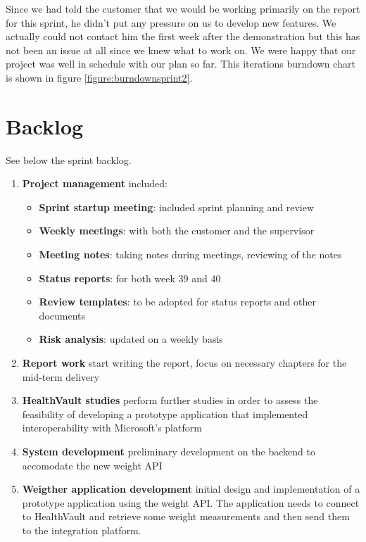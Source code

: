 Since we had told the customer that we would be working primarily on the report for this sprint, he didn't put any pressure on us to develop new features. 
We actually could not contact him the first week after the demonstration but this has not been an issue at all since we knew what to work on. 
We were happy that our project was well in schedule with our plan so far.
This iterations burndown chart is shown in figure \ref{figure:burndownsprint2}.

\clearpage
\section{Backlog}

See below the sprint backlog.
\begin{enumerate}[1.]
	\item \textbf{Project management} included:
	\begin{itemize}
		\item \textbf{Sprint startup meeting}:
			included sprint planning and review
		\item \textbf{Weekly meetings}:
			with both the customer and the supervisor
		\item \textbf{Meeting notes}:
			taking notes during meetings, reviewing of the notes
		\item \textbf{Status reports}:
			for both week 39 and 40
		\item \textbf{Review templates}:
			to be adopted for status reports and other documents
		\item \textbf{Risk analysis}:
			updated on a weekly basis
	\end{itemize}
	\item \textbf{Report work}\newline
		start writing the report, focus on necessary chapters for the mid-term delivery
	\item \textbf{HealthVault studies}\newline
		perform further studies in order to assess the feasibility of developing a prototype
		application that implemented interoperability with Microsoft's platform
	\item \textbf{System development}\newline
		preliminary development on the backend to accomodate the new weight API
	\item \textbf{Weigther application development}\newline
		initial design and implementation of a prototype application using the weight API.
		The application needs to connect to HealthVault and retrieve some weight measurements
		and then send them to the integration platform.
\end{enumerate}